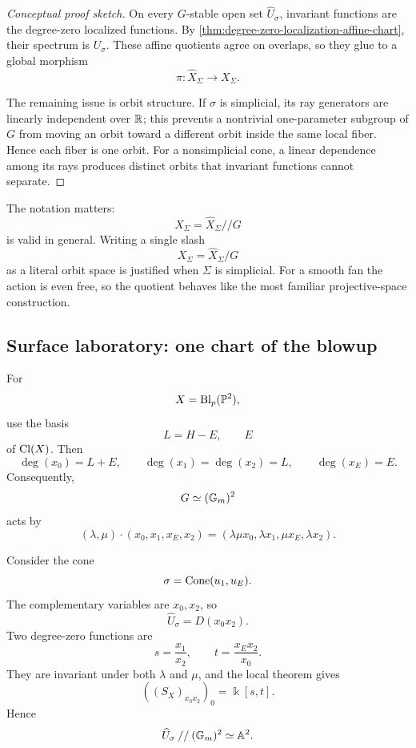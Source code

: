 \begin{proof}[Conceptual proof sketch]
On every \(G\)-stable open set \(\widehat U_\sigma\), invariant
functions are the degree-zero localized functions. By
\cref{thm:degree-zero-localization-affine-chart}, their spectrum is
\(U_\sigma\). These affine quotients agree on overlaps, so they glue
to a global morphism
\[
\pi:\widehat X_\Sigma\to X_\Sigma.
\]

The remaining issue is orbit structure. If \(\sigma\) is simplicial,
its ray generators are linearly independent over \(\RR\); this
prevents a nontrivial one-parameter subgroup of \(G\) from moving an
orbit toward a different orbit inside the same local fiber. Hence each
fiber is one orbit. For a nonsimplicial cone, a linear dependence among
its rays produces distinct orbits that invariant functions cannot
separate.
\end{proof}

\begin{warningbox}
The notation matters:
\[
X_\Sigma=\widehat X_\Sigma\mathbin{//}G
\]
is valid in general. Writing a single slash
\[
X_\Sigma=\widehat X_\Sigma/G
\]
as a literal orbit space is justified when \(\Sigma\) is simplicial.
For a smooth fan the action is even free, so the quotient behaves like
the most familiar projective-space construction.
\end{warningbox}

\subsection{Surface laboratory: one chart of the blowup}

For
\[
X=\Blp{\PP^2}{p},
\]
use the basis
\[
L=H-E,
\qquad
E
\]
of \(\Cl(X)\). Then
\[
\deg(x_0)=L+E,
\qquad
\deg(x_1)=\deg(x_2)=L,
\qquad
\deg(x_E)=E.
\]
Consequently,
\[
G\simeq(\Gm)^2
\]
acts by
\[
(\lambda,\mu)\cdot(x_0,x_1,x_E,x_2)
=
(\lambda\mu x_0,\lambda x_1,\mu x_E,\lambda x_2).
\]

Consider the cone
\[
\sigma=\Cone{u_1,u_E}.
\]
The complementary variables are \(x_0,x_2\), so
\[
\widehat U_\sigma=D(x_0x_2).
\]
Two degree-zero functions are
\[
s=\frac{x_1}{x_2},
\qquad
 t=\frac{x_Ex_2}{x_0}.
\]
They are invariant under both \(\lambda\) and \(\mu\), and the local
theorem gives
\[
\left((S_X)_{x_0x_2}\right)_0
=
\Bbbk[s,t].
\]
Hence
\[
\widehat U_\sigma\mathbin{//}(\Gm)^2
\simeq
\AAA^2.
\]

